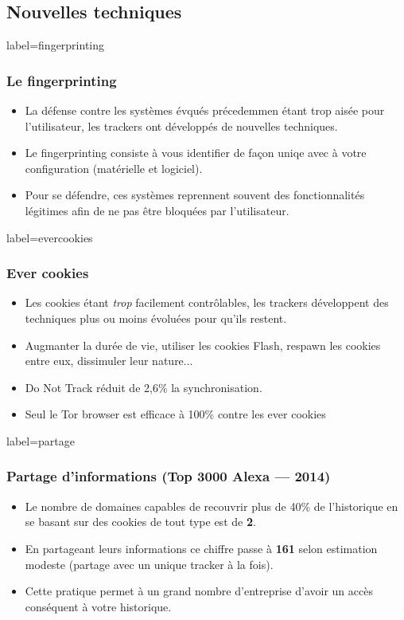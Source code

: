 \documentclass{beamer}
\begin{document}
    \subsection{Nouvelles techniques}
        \begin{frame}{label=fingerprinting}
            \frametitle{Le fingerprinting}
            \begin{center}
                \begin{itemize}
                    \item La défense contre les systèmes évqués précedemmen étant trop aisée pour l'utilisateur, les trackers ont développés de nouvelles techniques.
                    \item Le fingerprinting consiste à vous identifier de façon uniqe avec à votre configuration (matérielle et logiciel).
                    \item Pour se défendre, ces systèmes reprennent souvent des fonctionnalités légitimes afin de ne pas être bloquées par l'utilisateur.
                \end{itemize}
            \end{center}
        \end{frame}
        \begin{frame}{label=evercookies}
          \frametitle{Ever cookies}
            \begin{center}
                \begin{itemize}
                    \item Les cookies étant \textit{trop} facilement contrôlables, les trackers développent des techniques plus ou moins évoluées pour qu'ils restent.
                    \item Augmanter la durée de vie, utiliser les cookies Flash, respawn les cookies entre eux, dissimuler leur nature...
                    \item Do Not Track réduit de 2,6\% la synchronisation.
                    \item Seul le Tor browser est efficace à 100\% contre les ever cookies
                \end{itemize}
            \end{center}
        \end{frame}
        \begin{frame}{label=partage}
          \frametitle{Partage d'informations (Top 3000 Alexa --- 2014)}
            \begin{center}
                \begin{itemize}
                    \item Le nombre de domaines capables de recouvrir plus de 40\% de l'historique en se basant sur des cookies de tout type est de \textbf{2}.
                    \item En partageant leurs informations ce chiffre passe à \textbf{161} selon estimation modeste (partage avec un unique tracker à la fois).
                    \item Cette pratique permet à un grand nombre d'entreprise d'avoir un accès conséquent à votre historique.
                \end{itemize}
            \end{center}
        \end{frame}
\end{document}
